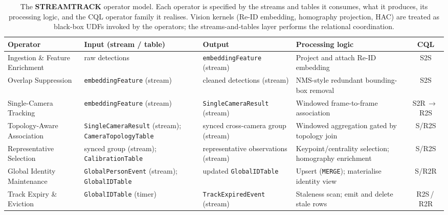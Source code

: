 \documentclass[review]{elsarticle}
\begin{document}
\begin{table}[tbh!]
    \centering
    \caption{The \textbf{STREAMTRACK} operator model. Each operator is specified by the streams and tables it consumes, what it produces, its processing logic, and the CQL operator family it realises. Vision kernels (Re-ID embedding, homography projection, HAC) are treated as black-box UDFs invoked by the operators; the streams-and-tables layer performs the relational
    coordination.}
    \label{tab:operatormodel}
    \small
    \setlength{\tabcolsep}{4pt}
    \renewcommand{\arraystretch}{1.25}
    \begin{tabularx}{\textwidth}{@{} l X X X c @{}}
        \toprule
        \textbf{Operator} & \textbf{Input (stream / table)} & \textbf{Output} & \textbf{Processing logic} & \textbf{CQL} \\
        \midrule
        Ingestion \& Feature Enrichment
            & raw detections
            & \texttt{embeddingFeature} (stream)
            & Project and attach Re-ID embedding
            & S2S \\
        \addlinespace
        Overlap Suppression
            & \texttt{embeddingFeature} (stream)
            & cleaned detections (stream)
            & NMS-style redundant bounding-box removal
            & S2S \\
        \addlinespace
        Single-Camera Tracking
            & \texttt{embeddingFeature} (stream)
            & \texttt{SingleCameraResult} (stream)
            & Windowed frame-to-frame association
            & S2R\,$\to$\,R2S \\
        \addlinespace
        Topology-Aware Association
            & \texttt{SingleCameraResult} (stream); \texttt{CameraTopologyTable}
            & synced cross-camera group (stream)
            & Windowed aggregation gated by topology join
            & S/R2S \\
        \addlinespace
        Representative Selection
            & synced group (stream); \texttt{CalibrationTable}
            & representative observations (stream)
            & Keypoint/centrality selection; homography enrichment
            & S/R2S \\
        \addlinespace
        Global Identity Maintenance
            & \texttt{GlobalPersonEvent} (stream); \texttt{GlobalIDTable}
            & updated \texttt{GlobalIDTable}
            & Upsert (\texttt{MERGE}); materialise identity view
            & S/R2R \\
        \addlinespace
        Track Expiry \& Eviction
            & \texttt{GlobalIDTable} (timer)
            & \texttt{TrackExpiredEvent} (stream)
            & Staleness scan; emit and delete stale rows
            & R2S\,/\,R2R \\
        \bottomrule
    \end{tabularx}
\end{table}
\end{document}
